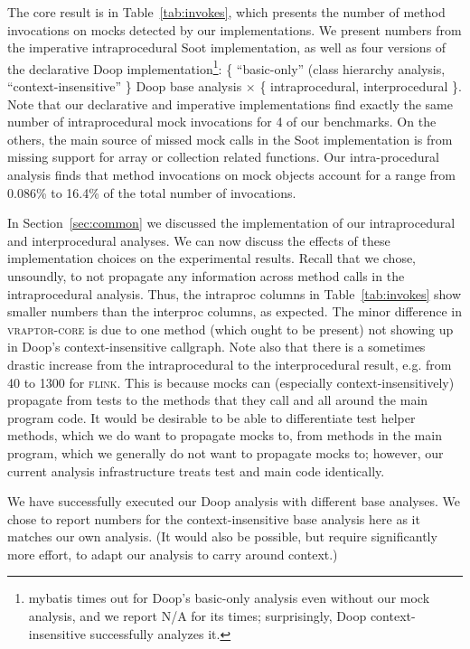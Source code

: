The core result is in Table~\ref{tab:invokes}, which presents the number of method invocations on mocks detected by our implementations. We present numbers from the imperative intraprocedural Soot implementation, as well as four versions of the declarative Doop implementation\footnote{mybatis times out for Doop's basic-only analysis even without our mock analysis, and we report N/A for its times; surprisingly, Doop context-insensitive successfully analyzes it.}: \{ ``basic-only'' (class hierarchy analysis, ``context-insensitive'' \} Doop base analysis $\times$ \{ intraprocedural, interprocedural \}. Note that our declarative and imperative implementations find exactly the same number of intraprocedural mock invocations for 4 of our benchmarks. On the others, the main source of missed mock calls in the Soot implementation is from missing support for array or collection related functions. Our intra-procedural analysis finds that method invocations on mock objects account for a range from 0.086\% to 16.4\% of the total number of invocations. 


In Section~\ref{sec:common} we discussed the implementation of our intraprocedural and interprocedural analyses. We can now discuss the effects of these implementation choices on the experimental results. Recall that we chose, unsoundly, to not propagate any information across method calls in the intraprocedural analysis. Thus, the intraproc columns in Table~\ref{tab:invokes} show smaller numbers than the interproc columns, as expected. The minor difference in \textsc{vraptor-core} is due to one method (which ought to be present) not showing up in Doop's context-insensitive callgraph. Note also that there is a sometimes drastic increase from the intraprocedural to the interprocedural result, e.g. from 40 to 1300 for \textsc{flink}. This is because mocks can (especially context-insensitively) propagate from tests to the methods that they call and all around the main program code. It would be desirable to be able to differentiate test helper methods, which we do want to propagate mocks to, from methods in the main program, which we generally do not want to propagate mocks to; however, our current analysis infrastructure treats test and main code identically.

We have successfully executed our Doop analysis with different base analyses. We chose to report numbers for the context-insensitive base analysis here as it matches our own analysis. (It would also be possible, but require significantly more effort, to adapt our analysis to carry around context.)

